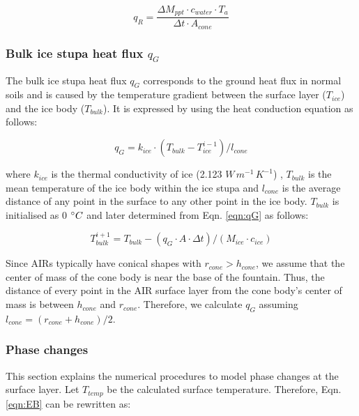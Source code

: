 \begin{equation}
	q_{R} = \frac{ \Delta M_{ppt} \cdot c_{water} \cdot T_a}{\Delta t \cdot A_{cone}}
	\label{eqn:qR}
\end{equation}

\subsubsection{Bulk ice stupa heat flux \texorpdfstring{$q_{G}$}{Lg}} \label{sec:Bulkflux}

The bulk ice stupa heat flux $q_{G}$ corresponds to the ground heat flux in normal soils and is caused by the
temperature gradient between the surface layer ($T_{ice}$) and the ice body ($T_{bulk}$). It is expressed by
using the heat conduction equation as follows:

\begin{equation} q_{G} = k_{ice} \cdot (T_{bulk}-T_{ice}^{i-1})/l_{cone} \label{eqn:qG}    \end{equation}

where $k_{ice}$ is the thermal conductivity of ice (2.123 $W\, m^{-1}\,K^{-1}$) , $T_{bulk}$ is the mean
temperature of the ice body within the ice stupa and $l_{cone}$ is the average distance of any point in the
surface to any other point in the ice body. $T_{bulk}$ is initialised as 0 $^{\circ} C$ and later determined from
Eqn. \ref{eqn:qG} as follows:

\begin{equation} T_{bulk}^{i+1} = T_{bulk} - (q_{G} \cdot A \cdot \Delta t)/(M_{ice} \cdot c_{ice}) \end{equation}

Since \ac{AIRs} typically have conical shapes with $r_{cone} > h_{cone}$, we assume that the center of mass of the cone
body is near the base of the fountain. Thus, the distance of every point in the AIR surface layer from the cone
body's center of mass is between $h_{cone}$ and $r_{cone}$. Therefore, we calculate $q_{G}$ assuming $l_{cone} = (r_{cone} +
	h_{cone})/2$.

\subsubsection{Phase changes}\label{sec:phase}

This section explains the numerical procedures to model phase changes at the surface layer. Let
$T_{temp}$ be the calculated surface temperature. Therefore, Eqn. \ref{eqn:EB} can be rewritten as:

